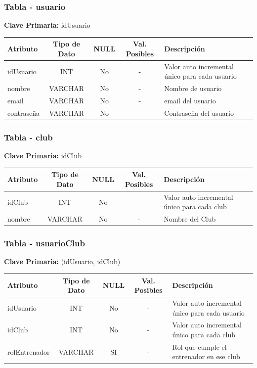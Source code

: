 \subsubsection{Tabla - usuario}

	\textbf{Clave Primaria: } idUsuario
	
	\begin{table}[H]
		\centering
		\begin{tabularx}{\textwidth}{|l|c|c|c|X|} \hline
			\textbf{Atributo} & \textbf{Tipo de Dato} & \textbf{NULL} & \textbf{Val. Posibles} & \textbf{Descripción} \\ \hline
			idUsuario & INT & No & - & Valor auto incremental único para cada usuario \\ \hline
			nombre & VARCHAR & No & - & Nombre de usuario \\ \hline
			email & VARCHAR & No & - & email del usuario\\ \hline
			contraseña & VARCHAR & No & - & Contraseña del usuario \\ \hline
		\end{tabularx}
	\end{table}

\subsubsection{Tabla - club}

\textbf{Clave Primaria: } idClub

\begin{table}[H]
	\centering
	\begin{tabularx}{\textwidth}{|l|c|c|c|X|} \hline
		\textbf{Atributo} & \textbf{Tipo de Dato} & \textbf{NULL} & \textbf{Val. Posibles} & \textbf{Descripción} \\ \hline
		idClub & INT & No & - & Valor auto incremental único para cada club \\ \hline
		nombre & VARCHAR & No & - & Nombre del Club \\ \hline
	\end{tabularx}
\end{table}

\subsubsection{Tabla - usuarioClub}

\textbf{Clave Primaria: } (idUsuario, idClub)

\begin{table}[H]
	\centering
	\begin{tabularx}{\textwidth}{|l|c|c|c|X|} \hline
		\textbf{Atributo} & \textbf{Tipo de Dato} & \textbf{NULL} & \textbf{Val. Posibles} & \textbf{Descripción} \\ \hline
		idUsuario & INT & No & - & Valor auto incremental único para cada usuario \\ \hline
		idClub & INT & No & - & Valor auto incremental único para cada club \\ \hline
		rolEntrenador & VARCHAR & SI & - & Rol que cumple el entrenador en ese club \\ \hline
	\end{tabularx}
\end{table}


